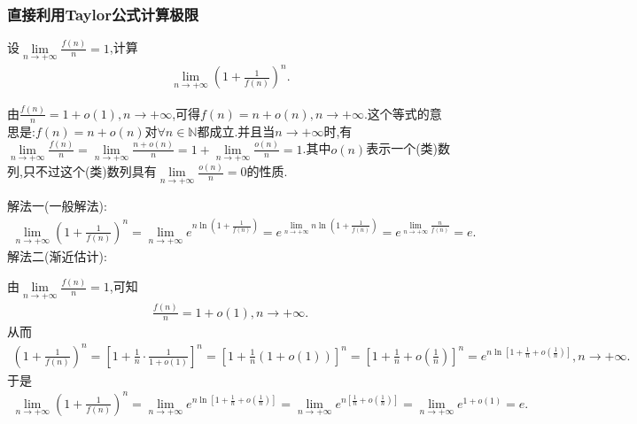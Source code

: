 \documentclass[../../main.tex]{subfiles}%
\begin{document}
\subsubsection{直接利用Taylor公式计算极限}

\begin{example}
设$\underset{n\rightarrow +\infty}{\lim}\frac{f\left( n \right)}{n}=1$,计算
\begin{align*}
\underset{n\rightarrow +\infty}{\lim}\left( 1+\frac{1}{f\left( n \right)} \right) ^n.
\end{align*}
\end{example}
\begin{note}
由$\frac{f\left( n \right)}{n}=1+o\left( 1 \right) ,n\rightarrow +\infty$,可得$f\left( n \right) =n+o\left( n \right) ,n\rightarrow +\infty$.这个等式的意思是:$f(n)=n+o(n)$对$\forall n\in \mathbb{N}$都成立.并且当$n\to +\infty$时,有$\underset{n\rightarrow +\infty}{\lim}\frac{f\left( n \right)}{n}=\underset{n\rightarrow +\infty}{\lim}\frac{n+o\left( n \right)}{n}=1+\underset{n\rightarrow +\infty}{\lim}\frac{o\left( n \right)}{n}=1
$.其中$o(n)$表示一个(类)数列,只不过这个(类)数列具有$\underset{n\rightarrow +\infty}{\lim}\frac{o\left( n \right)}{n}=0$的性质.
\end{note}
\begin{solution}

{\color{blue}解法一(一般解法):}
\begin{align*}
\underset{n\rightarrow +\infty}{\lim}\left( 1+\frac{1}{f\left( n \right)} \right) ^n=\underset{n\rightarrow +\infty}{\lim}e^{n\ln \left( 1+\frac{1}{f\left( n \right)} \right)}=e^{\underset{n\rightarrow +\infty}{\lim}n\ln \left( 1+\frac{1}{f\left( n \right)} \right)}=e^{\underset{n\rightarrow +\infty}{\lim}\frac{n}{f\left( n \right)}}=e.
\end{align*}
{\color{blue}解法二(渐近估计):}

由$\underset{n\rightarrow +\infty}{\lim}\frac{f\left( n \right)}{n}=1$,可知
\begin{align*}
\frac{f\left( n \right)}{n}=1+o\left( 1 \right) ,n\rightarrow +\infty .
\end{align*}
从而
\begin{align*}
\left( 1+\frac{1}{f\left( n \right)} \right) ^n=\left[ 1+\frac{1}{n}\cdot \frac{1}{1+o\left( 1 \right)} \right] ^n=\left[ 1+\frac{1}{n}\left( 1+o\left( 1 \right) \right) \right] ^n=\left[ 1+\frac{1}{n}+o\left( \frac{1}{n} \right) \right] ^n=e^{n\ln \left[ 1+\frac{1}{n}+o\left( \frac{1}{n} \right) \right]},n\to +\infty.
\end{align*}
于是
\begin{align*}
\underset{n\rightarrow +\infty}{\lim}\left( 1+\frac{1}{f\left( n \right)} \right) ^n=\underset{n\rightarrow +\infty}{\lim}e^{n\ln \left[ 1+\frac{1}{n}+o\left( \frac{1}{n} \right) \right]}=\underset{n\rightarrow +\infty}{\lim}e^{n\left[ \frac{1}{n}+o\left( \frac{1}{n} \right) \right]}=\underset{n\rightarrow +\infty}{\lim}e^{1+o\left( 1 \right)}=e.
\end{align*}

\end{solution}
\end{document}
